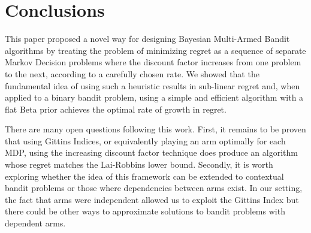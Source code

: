 \section{Conclusions} \label{sec:conclusions}
This paper proposed a novel way for designing Bayesian Multi-Armed Bandit algorithms by treating the problem of minimizing regret as a sequence of separate Markov Decision problems where the discount factor increases from one problem to the next, according to a carefully chosen rate. We  showed that the fundamental idea of using such a heuristic results in sub-linear regret and, when applied to a binary bandit problem, using a simple and efficient algorithm with a flat Beta prior achieves the optimal rate of growth in regret.

There are many open questions following this work. First, it remains to be proven that using Gittins Indices, or equivalently playing an arm optimally for each MDP, using the increasing discount factor technique does produce an algorithm whose regret matches the Lai-Robbins lower bound. Secondly, it is worth exploring whether the idea of this framework can be extended to contextual bandit problems or those where dependencies between arms exist. In our setting, the fact that arms were independent allowed us to exploit the Gittins Index but there could be other ways to approximate solutions to bandit problems with dependent arms.